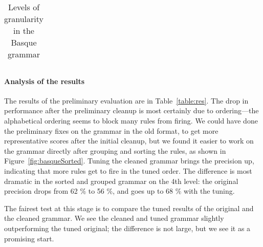 {{\begin{table}[t]
{\begin{tabular}{llll}
\end{tabular}
}
\caption{Levels of granularity in the Basque grammar}
\label{table:levels}
\end{table}



\paragraph{Analysis of the results}
\label{analysis}

The results of the preliminary evaluation are in
Table~\ref{table:res}.  The drop in performance after the preliminary
cleanup is most certainly due to ordering---the alphabetical ordering
seems to block many rules from firing. We could have done the
preliminary fixes on the grammar in the old format, to get more
representative scores after the initial cleanup, but we found it easier to work
on the grammar directly after grouping and sorting the rules, as shown
in Figure~\ref{fig:basqueSorted}.
Tuning the cleaned grammar brings the precision up, indicating that
more rules get to fire in the tuned order. The difference is most
dramatic in the sorted and grouped grammar on the 4th level: the
original precision drops from 62 \% to 56 \%, and goes up to 68 \%
with the tuning.

The fairest test at this stage is to compare the
tuned results of the original and the cleaned grammar.
We see the cleaned and tuned grammar slightly outperforming the tuned original;
the difference is not large, but we see it as a promising start.





}}
